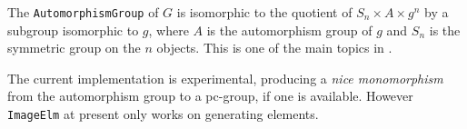\documentclass[a4paper,11pt]{report}
\begin{document}
{{{\begin{Verbatim}[commandchars=!@|,fontsize=\small,frame=single,label=Example]
\end{Verbatim}
 

 The  \texttt{AutomorphismGroup} of $G$ is isomorphic to the quotient of $S_n \times A \times g^n$ by a subgroup isomorphic to $g$, where $A$ is the automorphism group of $g$ and $S_n$ is the symmetric group on the $n$ objects. This is one of the main topics in \cite{AlWe}. 

 The current implementation is experimental, producing a \emph{nice monomorphism} from the automorphism group to a pc-group, if one is available. However \texttt{ImageElm} at present only works on generating elements. 

 }

 
\begin{Verbatim}[commandchars=@|D,fontsize=\small,frame=single,label=Example]
  

\end{Verbatim}}}
\end{document}
